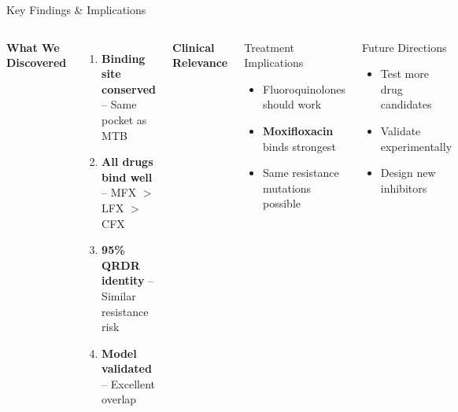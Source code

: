 \documentclass[aspectratio=169,xcolor=table]{beamer}
\begin{document}
\begin{frame}{Key Findings \& Implications}

\begin{columns}
\textbf{What We Discovered}
\begin{enumerate}\setlength{\itemsep}{2pt}
    \item \textbf{Binding site conserved} -- Same pocket as MTB
    \item \textbf{All drugs bind well} -- MFX $>$ LFX $>$ CFX
    \item \textbf{95\% QRDR identity} -- Similar resistance risk
    \item \textbf{Model validated} -- Excellent overlap
\end{enumerate}

\textbf{Clinical Relevance}

\begin{alertblock}{Treatment Implications}
\begin{itemize}\setlength{\itemsep}{0pt}
    \item Fluoroquinolones should work
    \item \textbf{Moxifloxacin} binds strongest
    \item Same resistance mutations possible
\end{itemize}
\end{alertblock}

\begin{block}{Future Directions}
\begin{itemize}\setlength{\itemsep}{0pt}
    \item Test more drug candidates
    \item Validate experimentally
    \item Design new inhibitors
\end{itemize}
\end{block}
\end{columns}

\end{frame}
\end{document}
